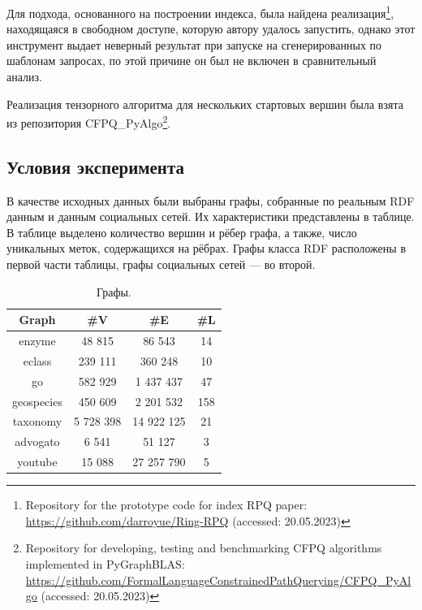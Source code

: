 Для подхода, основанного на построении индекса, была найдена реализация\footnote{Repository for the prototype code for index RPQ paper: \href{https://github.com/darroyue/Ring-RPQ}{https://github.com/darroyue/Ring-RPQ} (accessed: 20.05.2023)}, находящаяся в свободном доступе, которую автору удалось запустить, однако этот инструмент выдает неверный результат при запуске на сгенерированных по шаблонам запросах, по этой причине он был не включен в сравнительный анализ.

Реализация тензорного алгоритма для нескольких стартовых вершин была взята из репозитория CFPQ\_PyAlgo\footnote{Repository for developing, testing and benchmarking CFPQ algorithms implemented in PyGraphBLAS: \href{https://github.com/FormalLanguageConstrainedPathQuerying/CFPQ_PyAlgo}{https://github.com/FormalLanguageConstrainedPathQuerying/CFPQ\_PyAlgo} (accessed: 20.05.2023)}.

\subsection{Условия эксперимента}

В качестве исходных данных были выбраны графы, собранные по реальным RDF данным и данным социальных сетей. Их характеристики представлены в таблице. В таблице выделено количество вершин и рёбер графа, а также, число уникальных меток, содержащихся на рёбрах. Графы класса RDF расположены в первой части таблицы, графы социальных сетей --- во второй.

\begin{table}[!ht]
    \centering
    \begin{tabular}{|c|c|c|c|}
        \hline
        Graph      & \#V       & \#E        & \#L \\ \hline \hline
        enzyme     & 48 815    & 86 543     & 14  \\
        eclass     & 239 111   & 360 248    & 10  \\
        go         & 582 929   & 1 437 437  & 47  \\
        geospecies & 450 609   & 2 201 532  & 158 \\
        taxonomy   & 5 728 398 & 14 922 125 & 21  \\
        \hline
        advogato   & 6 541     & 51 127     & 3   \\
        youtube    & 15 088    & 27 257 790 & 5   \\
        \hline
    \end{tabular}
    \caption{Графы.}
\end{table}

